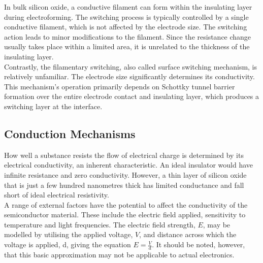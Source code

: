 \noindent In bulk silicon oxide, a conductive filament can form within the insulating layer during electroforming. The switching process is typically controlled by a single conductive filament, which is not affected by the electrode size.  The switching action leads to minor modifications to the filament. Since the resistance change usually takes place within a limited area, it is unrelated to the thickness of the insulating layer. \\

\noindent Contrastly, the filamentary switching, also called surface switching mechanism, is relatively unfamiliar. The electrode size significantly determines its conductivity.  This mechanism's operation primarily depends on Schottky tunnel barrier formation over the entire electrode contact and insulating layer, which produces a switching layer at the interface.

\subsection[Conduction Mechanisms]{Conduction Mechanisms}

How well a substance resists the flow of electrical charge is determined by its electrical conductivity, an inherent characteristic. An ideal insulator would have infinite resistance and zero conductivity.  However, a thin layer of silicon oxide that is just a few hundred nanometres thick has limited conductance and fall short of ideal electrical resistivity. \\

\noindent A range of external factors have the potential to affect the conductivity of the semiconductor material. These include the electric field applied, sensitivity to temperature and light frequencies.  The electric field strength, $E$, may be modelled by utilising the applied voltage, $V$, and distance across which the voltage is applied, d, giving the equation $E = \frac{V}{d}$. It should be noted, however, that this basic approximation may not be applicable to actual electronics. \\

